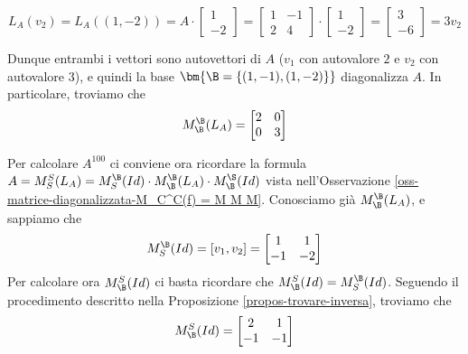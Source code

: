 \documentclass[11pt, a4paper, titlepage, oneside]{scrbook}
\begin{document}
\[L_A(v_2) = L_A((1,-2)) = A \cdot \begin{bmatrix}
        1 \\ -2
    \end{bmatrix} = \begin{bmatrix}
    1 & -1 \\
    2 & 4    
    \end{bmatrix} \cdot \begin{bmatrix}
        1 \\
        -2
    \end{bmatrix}
    =
    \begin{bmatrix}
        3 \\ -6
    \end{bmatrix}= 3 v_2 \]

Dunque entrambi i vettori sono autovettori di $A$ ($v_1$ con autovalore $2$ e $v_2$ con autovalore $3$), e quindi la base $\bm{\B = \{(1,-1), (1,-2)\}}$ diagonalizza $A$. In particolare, troviamo che 
\[M_\B^\B(L_A) = 
\begin{bmatrix}
    2 & 0 \\
    0 & 3
\end{bmatrix}
\]

Per calcolare $A^{100}$ ci conviene ora ricordare la formula $A = M_S^S(L_A) = M_S^\B(Id) \cdot M_\B^\B(L_A) \cdot M_\B^\S(Id)$ vista nell'Osservazione \ref{oss-matrice-diagonalizzata-M_C^C(f) = M M M}. Conosciamo già $M_\B^\B(L_A)$, e sappiamo che 
\[
M_S^\B(Id) = [v_1, v_2] = \begin{bmatrix}
    1 & 1 \\
    -1 & -2
\end{bmatrix}
\]
Per calcolare ora $M_\B^S(Id)$ ci basta ricordare che $M_\B^S(Id) = M_S^\B(Id)$. Seguendo il procedimento descritto nella Proposizione \ref{propos-trovare-inversa}, troviamo che 
\[
M_\B^S(Id) = \begin{bmatrix}
    2 & 1\\
    -1 & -1
\end{bmatrix}
\]
\end{document}
